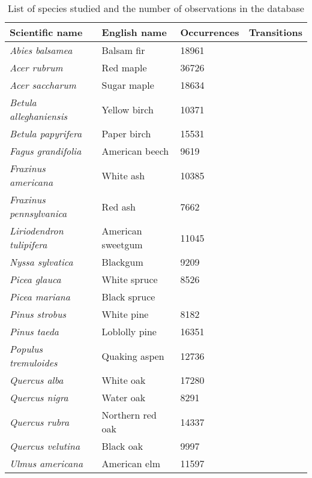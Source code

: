 \begin{table}[tb]
\label{tab:species_list}
\caption{List of species studied and the number of observations in the database}
\begin{tabular}{llll}
\toprule
Scientific name               & English name   & Occurrences & Transitions \\ 
\midrule
{\it Abies balsamea}          & Balsam fir        & 18961       &             \\
{\it Acer rubrum}             & Red maple         & 36726       &             \\
{\it Acer saccharum}          & Sugar maple       & 18634       &             \\
{\it Betula alleghaniensis}   & Yellow birch      & 10371       &             \\
{\it Betula papyrifera}       & Paper birch       & 15531       &             \\
{\it Fagus grandifolia}       & American beech    & 9619        &             \\
{\it Fraxinus americana}      & White ash         & 10385       &             \\
{\it Fraxinus pennsylvanica}  & Red ash           & 7662        &             \\
{\it Liriodendron tulipifera} & American sweetgum & 11045       &             \\
{\it Nyssa sylvatica}         & Blackgum          & 9209        &             \\
{\it Picea glauca}            & White spruce      & 8526        &             \\
{\it Picea mariana}           & Black spruce      &             &             \\
{\it Pinus strobus}           & White pine        & 8182        &             \\
{\it Pinus taeda}             & Loblolly pine     & 16351       &             \\
{\it Populus tremuloides}     & Quaking aspen     & 12736       &             \\ 
{\it Quercus alba}            & White oak         & 17280       &             \\
{\it Quercus nigra}           & Water oak         & 8291        &             \\
{\it Quercus rubra}           & Northern red oak  & 14337       &             \\
{\it Quercus velutina}        & Black oak         & 9997        &             \\
{\it Ulmus americana}         & American elm      & 11597       &             \\ 
\bottomrule
\end{tabular}
\end{table}